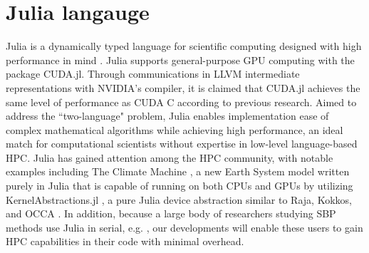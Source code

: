 \section{Julia langauge}

Julia is a dynamically typed language for scientific computing designed with high performance in mind \cite{bezanson2017julia}.
 Julia supports general-purpose GPU computing with the package CUDA.jl. Through communications in LLVM intermediate representations with NVIDIA's compiler, it is claimed that CUDA.jl achieves the same level of performance as CUDA C according to previous research\cite{besard2018effective}.
Aimed to address the ``two-language" problem, Julia enables implementation ease of complex mathematical algorithms while achieving high performance, an ideal match for computational scientists without expertise in low-level language-based HPC. Julia has gained attention among the HPC community, with notable examples including The Climate Machine \cite{clima}, a new Earth System model written purely in Julia that is capable of running on both CPUs and GPUs by utilizing KernelAbstractions.jl \cite{valentin_churavy_2024_10780635}, a pure Julia device abstraction similar to Raja, Kokkos, and OCCA \cite{8945721, CARTEREDWARDS20143202, Medina}. In addition, because a large body of researchers studying SBP methods use Julia in serial, e.g. \cite{Kozdon2020HybridizedSF,ranocha2021new}, our developments will enable these users to gain HPC capabilities in their code with minimal overhead.
